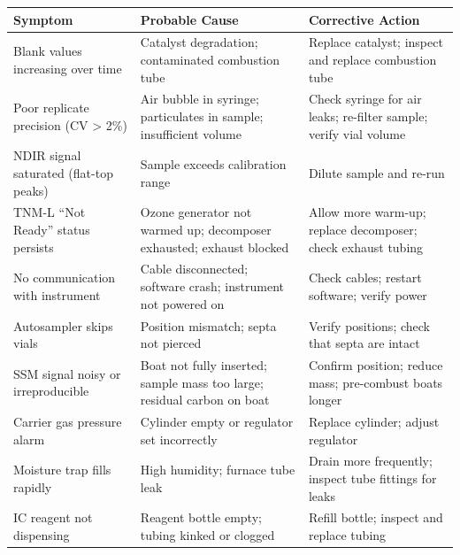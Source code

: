 \documentclass[
  11pt,
  letterpaper,
]{article}
\newcounter{none} %
\begin{document}
{\def\LTcaptype{none} %
\begin{longtable}[]{@{}
  >{\raggedright\arraybackslash}p{}
  >{\raggedright\arraybackslash}p{}
  >{\raggedright\arraybackslash}p{}@{}}
\toprule\noalign{}
\begin{minipage}[b]{\linewidth}\raggedright
Symptom
\end{minipage} & \begin{minipage}[b]{\linewidth}\raggedright
Probable Cause
\end{minipage} & \begin{minipage}[b]{\linewidth}\raggedright
Corrective Action
\end{minipage} \\
\midrule\noalign{}
\endhead
\bottomrule\noalign{}
\endlastfoot
Blank values increasing over time & Catalyst degradation; contaminated
combustion tube & Replace catalyst; inspect and replace combustion
tube \\
Poor replicate precision (CV \textgreater{} 2\%) & Air bubble in
syringe; particulates in sample; insufficient volume & Check syringe for
air leaks; re-filter sample; verify vial volume \\
NDIR signal saturated (flat-top peaks) & Sample exceeds calibration
range & Dilute sample and re-run \\
TNM-L ``Not Ready'' status persists & Ozone generator not warmed up;
decomposer exhausted; exhaust blocked & Allow more warm-up; replace
decomposer; check exhaust tubing \\
No communication with instrument & Cable disconnected; software crash;
instrument not powered on & Check cables; restart software; verify
power \\
Autosampler skips vials & Position mismatch; septa not pierced & Verify
positions; check that septa are intact \\
SSM signal noisy or irreproducible & Boat not fully inserted; sample
mass too large; residual carbon on boat & Confirm position; reduce mass;
pre-combust boats longer \\
Carrier gas pressure alarm & Cylinder empty or regulator set incorrectly
& Replace cylinder; adjust regulator \\
Moisture trap fills rapidly & High humidity; furnace tube leak & Drain
more frequently; inspect tube fittings for leaks \\
IC reagent not dispensing & Reagent bottle empty; tubing kinked or
clogged & Refill bottle; inspect and replace tubing \\
\end{longtable}
}
\end{document}
